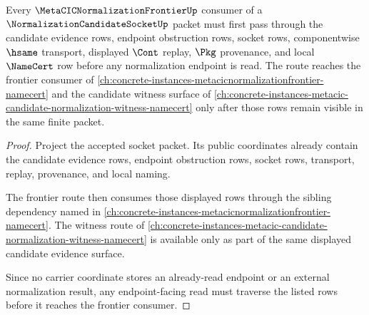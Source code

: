 \begin{theorem}
\label{thm:normalization-candidate-socket-frontier-crossref}
Every $\MetaCICNormalizationFrontierUp$ consumer of a $\NormalizationCandidateSocketUp$ packet must first pass through the candidate evidence rows, endpoint obstruction rows, socket rows, componentwise $\hsame$ transport, displayed $\Cont$ replay, $\Pkg$ provenance, and local $\NameCert$ row before any normalization endpoint is read. The route reaches the frontier consumer of \autoref{ch:concrete-instances-metacicnormalizationfrontier-namecert} and the candidate witness surface of \autoref{ch:concrete-instances-metacic-candidate-normalization-witness-namecert} only after those rows remain visible in the same finite packet.
\end{theorem}
\begin{proof}
Project the accepted socket packet. Its public coordinates already contain the candidate evidence rows, endpoint obstruction rows, socket rows, transport, replay, provenance, and local naming.

The frontier route then consumes those displayed rows through the sibling dependency named in \autoref{ch:concrete-instances-metacicnormalizationfrontier-namecert}. The witness route of \autoref{ch:concrete-instances-metacic-candidate-normalization-witness-namecert} is available only as part of the same displayed candidate evidence surface.

Since no carrier coordinate stores an already-read endpoint or an external normalization result, any endpoint-facing read must traverse the listed rows before it reaches the frontier consumer.
\end{proof}

